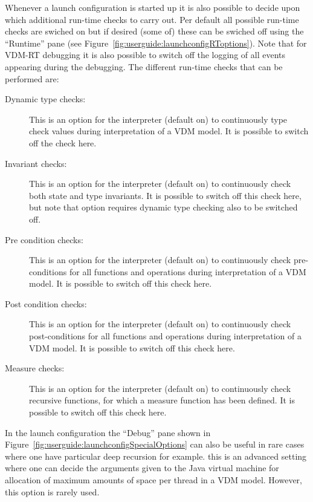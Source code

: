 \documentclass{overturerepchap}
\begin{document}
Whenever a launch configuration is started up it is also possible to
decide upon which additional run-time checks to carry out. Per default
all possible run-time checks are swiched on but if desired (some of)
these can be swiched off using the ``Runtime'' pane (see
Figure~\ref{fig:userguide:launchconfigRToptions}). Note that for
VDM-RT debugging it is also possible to switch off the logging of all
events appearing during the debugging. The different run-time checks
that can be performed are:

\begin{description}
\item[Dynamic type checks:] This is an option for the interpreter (default on) 
  to continuously type check  values during interpretation of a VDM model.
  It is possible to switch off the check here.
\item[Invariant checks:] This is an option for the interpreter (default on) 
  to continuously check both state and type invariants.
  It is possible to switch off
  this check here, but note that option requires dynamic type
  checking also to be switched off.
\item[Pre condition checks:] This is an option for the interpreter (default on) 
  to continuously check pre-conditions for all functions and operations
  during interpretation of a VDM model. It is possible to switch off
  this check here.
\item[Post condition checks:] This is an option for the interpreter (default on) 
  to continuously check post-conditions for all functions and operations
  during interpretation of a VDM model. It is possible to switch off
  this check here.
\item[Measure checks:] This is an option for the interpreter (default
  on) to continuously check recursive functions, for which a
  measure function has been defined. It is possible to switch off this
  check here.
\end{description}

In the launch
configuration the ``Debug'' pane shown in
Figure~\ref{fig:userguide:launchconfigSpecialOptions} can also be
useful in rare cases where one have particular deep recursion for
example. this is an advanced setting where one can decide the
arguments given to the Java virtual machine for allocation of maximum
amounts of space per thread in a VDM model. However, this option is
rarely used.
\end{document}
